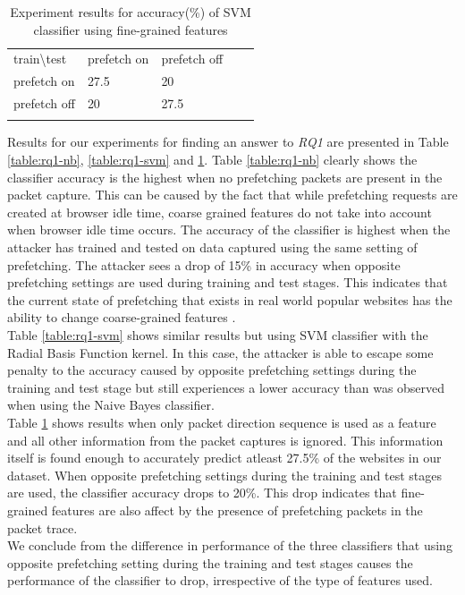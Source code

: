 \begin{table}[]
\centering
\caption{Experiment results for accuracy(\%) of SVM classifier using fine-grained features}
\label{table:rq1-svm-strdist}
\begin{tabular}{lllll}
\cline{1-3}
\multicolumn{1}{|l|}{train\textbackslash test} & \multicolumn{1}{l|}{prefetch on} & \multicolumn{1}{l|}{prefetch off} &  &  \\ \cline{1-3}
\multicolumn{1}{|l|}{prefetch on}                    & \multicolumn{1}{l|}{27.5}         & \multicolumn{1}{l|}{20}          &  &  \\ \cline{1-3}
\multicolumn{1}{|l|}{prefetch off}                   & \multicolumn{1}{l|}{20}         & \multicolumn{1}{l|}{27.5}          &  &  \\ \cline{1-3}
                                                     &                                  &                                   &  & 
\end{tabular}                  
\end{table}

Results for our experiments for finding an answer to \emph{RQ1} are presented in Table \ref{table:rq1-nb}, \ref{table:rq1-svm} and \ref{table:rq1-svm-strdist}. 
Table \ref{table:rq1-nb} clearly shows the classifier accuracy is the highest when no prefetching packets are present in the packet capture. 
This can be caused by the fact that while prefetching requests are created at browser idle time, coarse grained features do not take into account when browser idle time occurs. 
The accuracy of the classifier is highest when the attacker has trained and tested on data captured using the same setting of prefetching. 
The attacker sees a drop of 15\% in accuracy when opposite prefetching settings are used during training and test stages.
This indicates that the current state of prefetching that exists in real world popular websites has the ability to change coarse-grained features .\\
Table \ref{table:rq1-svm} shows similar results but using SVM classifier with the Radial Basis Function kernel. 
In this case, the attacker is able to escape some penalty to the accuracy caused by opposite prefetching settings during the training and test stage but still experiences a lower accuracy than was observed when using the Naive Bayes classifier.\\
Table \ref{table:rq1-svm-strdist} shows results when only packet direction sequence is used as a feature and all other information from the packet captures is ignored. 
This information itself is found enough to accurately predict atleast 27.5\% of the websites in our dataset. 
When opposite prefetching settings during the training and test stages are used, the classifier accuracy drops to 20\%. This drop indicates that fine-grained features are also affect by the presence of prefetching packets in the packet trace.\\
We conclude from the difference in performance of the three classifiers that using opposite prefetching setting during the training and test stages causes the performance of the classifier to drop, irrespective of the type of features used.\\

